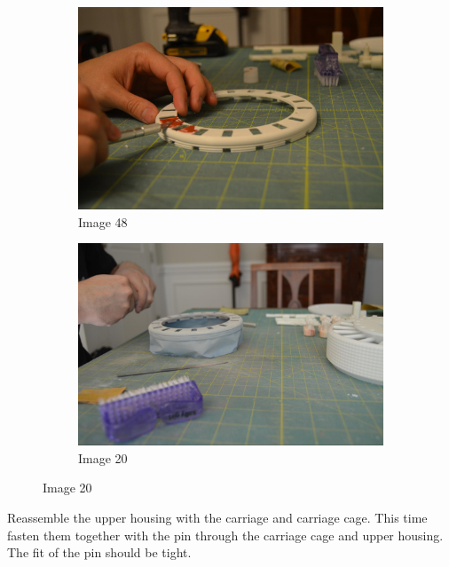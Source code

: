 \documentclass[openany]{book}
\begin{document}
\begin{figure}[!ht]
	\centering
	\begin{subfigure}{.4\textwidth}
		\centering
		\includegraphics[width=.95\textwidth]{images/image48.jpg}
		\caption{Image 48}
		\label{fig:image48}	
	\end{subfigure}
	\begin{subfigure}{.4\textwidth}
		\centering
		\includegraphics[width=.95\textwidth]{images/image20.jpg}
		\caption{Image 20}
		\label{fig:image20}	
	\end{subfigure}
\end{figure}


Reassemble the upper housing with the carriage and carriage cage. This time fasten them together with the pin through the carriage cage and upper housing. The fit of the pin should be tight.
\end{document}
